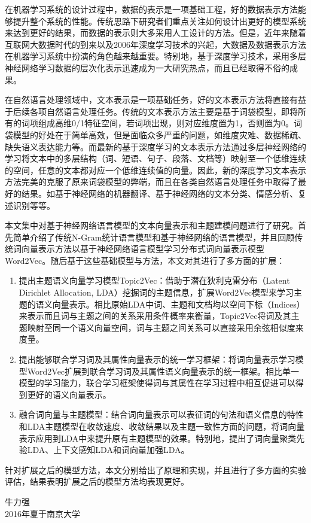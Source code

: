 \documentclass[master]{njuthesis}
\begin{document}
%
\begin{preface}

在机器学习系统的设计过程中，数据的表示是一项基础工程，好的数据表示方法能够提升整个系统的性能。传统思路下研究者们重点关注如何设计出更好的模型系统来达到更好的结果，而数据的表示则大多采用人工设计的方法。但是，近年来随着互联网大数据时代的到来以及2006年深度学习技术的兴起，大数据及数据表示方法在机器学习系统中扮演的角色越来越重要。特别地，基于深度学习技术，采用多层神经网络学习数据的层次化表示迅速成为一大研究热点，而且已经取得不俗的成果。

在自然语言处理领域中，文本表示是一项基础任务，好的文本表示方法将直接有益于后续各项自然语言处理任务。传统的文本表示方法主要是基于词袋模型，即将所有的词项组成高维0/1特征空间，若词项出现，则对应维度置为1，否则置为0。词袋模型的好处在于简单高效，但是面临众多严重的问题，如维度灾难、数据稀疏、缺失语义表达能力等。而最新的基于深度学习的文本表示方法通过多层神经网络的学习将文本中的多层结构（词、短语、句子、段落、文档等）映射至一个低维连续的空间，任意的文本都对应一个低维连续值的向量。因此，新的深度学习文本表示方法完美的克服了原来词袋模型的弊端，而且在各类自然语言处理任务中取得了最好的结果。如基于神经网络的机器翻译、基于神经网络的文本分类、情感分析、复述识别等等\cite{mikolov2013efficient,collobert2008unified,socher2011dynamic}。

本文集中对基于神经网络语言模型的文本向量表示和主题建模问题进行了研究。首先简单介绍了传统N-Gram统计语言模型和基于神经网络的语言模型，并且回顾传统词向量表示方法以基于神经网络语言模型学习分布式词向量表示模型Word2Vec。随后基于这些基础模型与方法，本文对其进行了多方面的扩展：

\begin{enumerate}
\item 提出主题语义向量学习模型Topic2Vec：借助于潜在狄利克雷分布（Latent Dirichlet Allocation, LDA）挖掘词的主题信息，扩展Word2Vec模型来学习主题的语义向量表示。相比原始LDA中词、主题和文档均以空间下标（Indices）来表示而且词与主题之间的关系采用条件概率来衡量，Topic2Vec将词及其主题映射至同一个语义向量空间，词与主题之间关系可以直接采用余弦相似度来度量。
\item 提出能够联合学习词及其属性向量表示的统一学习框架：将词向量表示学习模型Word2Vec扩展到联合学习词及其属性语义向量表示的统一框架。相比单一模型的学习能力，联合学习框架使得词与其属性在学习过程中相互促进可以得到更好的语义向量表示。
\item 融合词向量与主题模型：结合词向量表示可以表征词的句法和语义信息的特性和LDA主题模型在收敛速度、收敛结果以及主题一致性方面的问题，将词向量表示应用到LDA中来提升原有主题模型的效果。特别地，提出了词向量聚类先验LDA、上下文感知LDA和词向量加强LDA。
\end{enumerate}
针对扩展之后的模型方法，本文分别给出了原理和实现，并且进行了多方面的实验评估，结果表明扩展之后的模型方法均表现更好。

\vspace{1cm}
\begin{flushright}
牛力强\\
2016年夏于南京大学
\end{flushright}

\end{preface}
\end{document}
